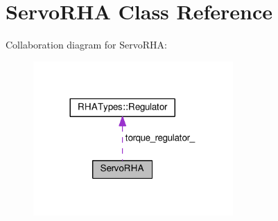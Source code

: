 \hypertarget{classServoRHA}{}\section{Servo\+R\+HA Class Reference}
\label{classServoRHA}


Collaboration diagram for Servo\+R\+HA\+:
\nopagebreak
\begin{figure}[H]
\begin{center}
\leavevmode
\includegraphics[width=216pt]{classServoRHA__coll__graph}
\end{center}
\end{figure}
